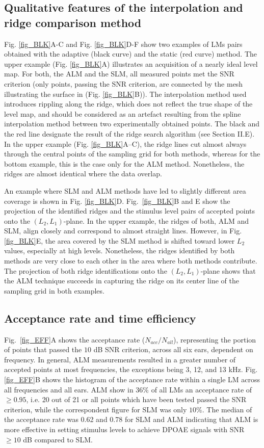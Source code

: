 \documentclass[journal,twoside,web]{ieeecolor2}
\begin{document}
\subsection{Qualitative features of the interpolation and ridge comparison method}
Fig. \ref{fig_BLK}A-C and Fig. \ref{fig_BLK}D-F show two examples of LMs pairs obtained with the adaptive (black curve) and the static (red curve) method.
The upper example (Fig. \ref{fig_BLK}A) illustrates an acquisition of a nearly ideal level map.
For both, the ALM and the SLM, all measured points met the SNR criterion (only points, passing the SNR criterion, are connected by the mesh illustrating the surface in (Fig. \ref{fig_BLK}B)).
The interpolation method used introduces rippling along the ridge, which does not reflect the true shape of the level map, and should be considered as an artefact resulting from the spline interpolation method between two experimentally obtained points.
The black and the red line designate the result of the ridge search algorithm (see Section II.E).
In the upper example (Fig. \ref{fig_BLK}A–C), the ridge lines cut almost always through the central points of the sampling grid for both methods, whereas for the bottom example, this is the case only for the ALM method. Nonetheless, the ridges are almost identical where the data overlap.


An example where SLM and ALM methods have led to slightly different area coverage is shown in Fig. \ref{fig_BLK}D.
Fig.~\ref{fig_BLK}B and E show the projection of the identified ridges and the stimulus level pairs of accepted points onto the $(L_2, L_1)$-plane.
In the upper example, the ridges of both, ALM and SLM, align closely and correspond to almost straight lines.
However, in Fig. \ref{fig_BLK}E,  the area covered by the SLM method is shifted toward lower $L_2$ values, especially at high levels. Nonetheless, the ridges identified by both methods are very close to each other in the area where both methods contribute.
The projection of both ridge identifications onto the $(L_2, L_1)$-plane shows that the ALM technique succeeds in capturing the ridge on its center line of the sampling grid in both examples.

\subsection{Acceptance rate and time efficiency}
Fig.~\ref{fig_EFF}A shows the acceptance rate ($N_{acc}/N_{all}$), representing the portion of points that passed the $10$ dB SNR criterion, across all six ears, dependent on frequency.
In general, ALM measurements resulted in a greater number of accepted points at most frequencies, the exceptions being 3, 12, and 13 kHz.
Fig. \ref{fig_EFF}B shows the histogram of the acceptance rate within a single LM across all frequencies and all ears.
ALM show in $36\%$ of all LMs an acceptance rate of $\ge 0.95$, i.e. 20 out of 21 or all points which have been tested passed the SNR criterion, while the correspondent figure for SLM was only $10\%$.
The median of the acceptance rate was 0.62 and 0.78 for SLM and ALM indicating that ALM is more effective in setting stimulus levels to achieve DPOAE signals with SNR $\ge10$ dB compared to SLM.
\end{document}
